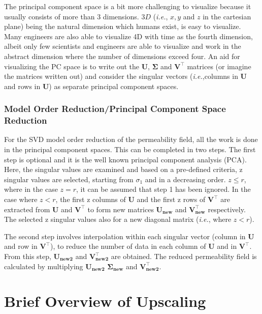 \documentclass[preprint,12pt]{elsarticle}
\begin{document}
The principal component space is a bit more challenging to visualize because it usually consists of more than $3$ dimensions. $3D$ ({\it i.e.}, $x, y$ and $z$ in the cartesian plane) being the natural dimension which humans exist, is easy to visualize. Many engineers are also able to visualize 4D with time as the fourth dimension, albeit only few scientists and engineers are able to visualize and work in the abstract dimension where the number of dimensions exceed four. An aid for visualizing the PC space is to write out the $\mathbf{U}$, $\mathbf{\Sigma}$ and $\mathbf{V^{\intercal}}$ matrices (or imagine the matrices written out) and consider the singular vectors ({\it i.e.},columns in $\mathbf{U}$ and rows in $\mathbf{U}$) as separate principal component spaces.

\subsubsection{Model Order Reduction/Principal Component Space Reduction}\label{subsubsection:svdcase_preprocess_algorithm}
 For the SVD model order reduction of the permeability field, all the work is done in the principal component spaces. This can be completed in two steps. The first step is optional and it is the well known principal component analysis (PCA). Here, the singular values are examined and based on a pre-defined criteria, z singular values are selected, starting from $\sigma_{1}$ and in a decreasing order. $z \leq r$, where in the case $z = r$, it can be assumed that step 1 has been ignored. In the case where $z < r$, the first z columns of $\mathbf{U}$ and the first z rows of $\mathbf{V^{\intercal}}$ are extracted from $\mathbf{U}$ and $\mathbf{V^{\intercal}}$ to form new matrices $\mathbf{U_{new}}$ and $\mathbf{V^{\intercal}_{new}}$ respectively. The selected z singular values also for a new diagonal matrix ({\it i.e.}, where $z < r$).

The second step involves interpolation within each singular vector (column in $\mathbf{U}$ and row in $\mathbf{V^{\intercal}}$), to reduce the number of data in each column of  $\mathbf{U}$ and in $\mathbf{V^{\intercal}}$. From this step,  $\mathbf{U_{new2}}$ and $\mathbf{V^{\intercal}_{new2}}$ are obtained. The reduced permeability field is calculated by multiplying  $\mathbf{U_{new2}}$ $\mathbf{\Sigma_{new}}$ and $\mathbf{V^{\intercal}_{new2}}$. 

\section{Brief Overview of Upscaling}\label{section:overview_upscaling}
\end{document}
